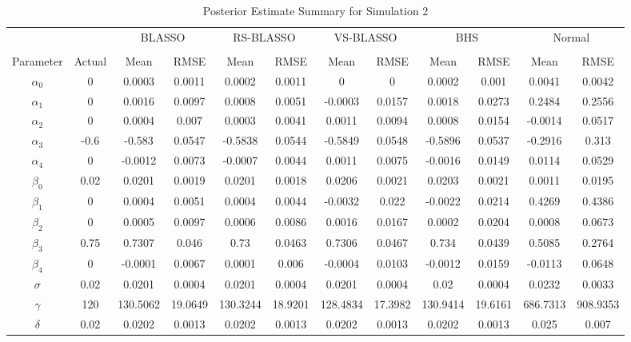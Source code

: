 \begin{table}
	\small
  \centering
  \caption{Posterior Estimate Summary for Simulation 2}
  \begin{tabular}{cccccccccccc}
    \toprule
   & & \multicolumn{2}{c}{BLASSO} &\multicolumn{2}{c}{RS-BLASSO} &\multicolumn{2}{c}{VS-BLASSO}  & \multicolumn{2}{c}{BHS} & \multicolumn{2}{c}{Normal} \\
    \cline{3-4} \cline{5-6} \cline{7-8} \cline{9-10} \cline{11-12}\\
    Parameter & Actual & Mean  & RMSE &  Mean & RMSE & Mean & RMSE & Mean & RMSE & Mean & RMSE   \\
    \midrule
    $\alpha_0$ & 0    & 0.0003 & 0.0011 & 0.0002 & 0.0011 & 0    & 0    & 0.0002 & 0.001 & 0.0041 & 0.0042 \\
    $\alpha_1$ & 0    & 0.0016 & 0.0097 & 0.0008 & 0.0051 & -0.0003 & 0.0157 & 0.0018 & 0.0273 & 0.2484 & 0.2556 \\
    $\alpha_2$ & 0    & 0.0004 & 0.007 & 0.0003 & 0.0041 & 0.0011 & 0.0094 & 0.0008 & 0.0154 & -0.0014 & 0.0517 \\
    $\alpha_3$ & -0.6 & -0.583 & 0.0547 & -0.5838 & 0.0544 & -0.5849 & 0.0548 & -0.5896 & 0.0537 & -0.2916 & 0.313 \\
    $\alpha_4$ & 0    & -0.0012 & 0.0073 & -0.0007 & 0.0044 & 0.0011 & 0.0075 & -0.0016 & 0.0149 & 0.0114 & 0.0529 \\
    $\beta_0$ & 0.02 & 0.0201 & 0.0019 & 0.0201 & 0.0018 & 0.0206 & 0.0021 & 0.0203 & 0.0021 & 0.0011 & 0.0195 \\
    $\beta_1$ & 0    & 0.0004 & 0.0051 & 0.0004 & 0.0044 & -0.0032 & 0.022 & -0.0022 & 0.0214 & 0.4269 & 0.4386 \\
    $\beta_2$ & 0    & 0.0005 & 0.0097 & 0.0006 & 0.0086 & 0.0016 & 0.0167 & 0.0002 & 0.0204 & 0.0008 & 0.0673 \\
    $\beta_3$ & 0.75 & 0.7307 & 0.046 & 0.73 & 0.0463 & 0.7306 & 0.0467 & 0.734 & 0.0439 & 0.5085 & 0.2764 \\
    $\beta_4$ & 0    & -0.0001 & 0.0067 & 0.0001 & 0.006 & -0.0004 & 0.0103 & -0.0012 & 0.0159 & -0.0113 & 0.0648 \\
    $\sigma$ & 0.02 & 0.0201 & 0.0004 & 0.0201 & 0.0004 & 0.0201 & 0.0004 & 0.02 & 0.0004 & 0.0232 & 0.0033 \\
    $\gamma$ & 120  & 130.5062 & 19.0649 & 130.3244 & 18.9201 & 128.4834 & 17.3982 & 130.9414 & 19.6161 & 686.7313 & 908.9353 \\
    $\delta$ & 0.02 & 0.0202 & 0.0013 & 0.0202 & 0.0013 & 0.0202 & 0.0013 & 0.0202 & 0.0013 & 0.025 & 0.007 \\
    \bottomrule
    \end{tabular}%
  \label{tab:blassobhssummary3}%
\end{table}%

